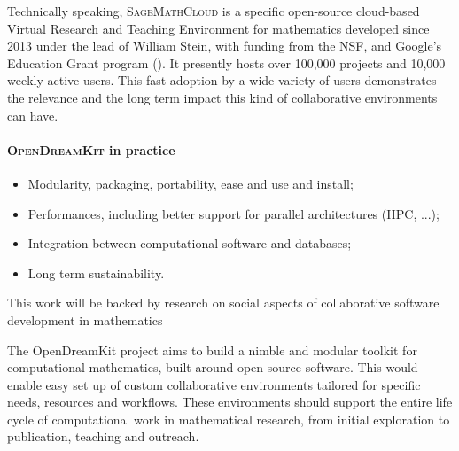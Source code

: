 \documentclass{llncs}
\newcommand{\software}[1]{\textsc{#1}\xspace}
\newcommand{\SMC}{\software{SageMathCloud}}
\newcommand{\ODK}{\software{OpenDreamKit}}
\begin{document}
Technically speaking, \SMC is a specific open-source cloud-based
Virtual Research and Teaching Environment for mathematics developed
since 2013 under the lead of William Stein, with funding from the NSF,
and Google's Education Grant program ().
It presently hosts over 100,000 projects and 10,000 weekly active
users. This fast adoption by a wide variety of users demonstrates the
relevance and the long term impact this kind of collaborative
environments can have.


\paragraph{\ODK in practice}

\begin{itemize}
\item Modularity, packaging, portability, ease and use and install;
\item Performances, including better support for parallel
  architectures (HPC, ...);
\item Integration between computational software and databases;
\item Long term sustainability.
\end{itemize}



This work will be backed by research on social aspects of
collaborative software development in mathematics





The OpenDreamKit project aims to build a nimble and modular toolkit for computational
mathematics, built around open source software. This would enable easy set up of custom
collaborative environments tailored for specific needs, resources and workflows. These
environments should support the entire life cycle of computational work in mathematical
research, from initial exploration to publication, teaching and outreach.
\end{document}
